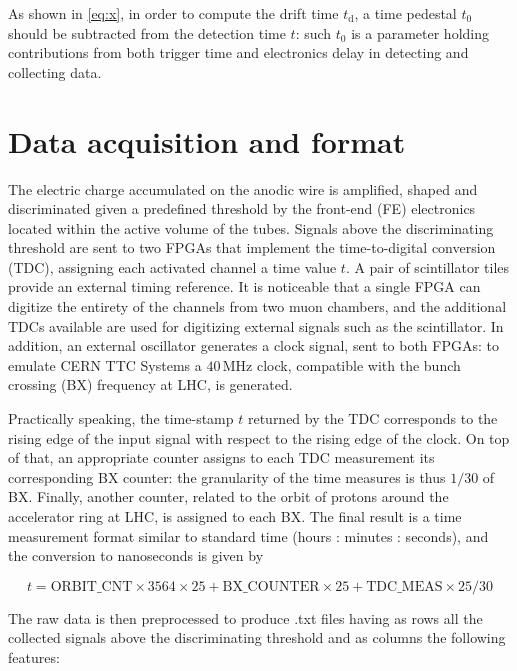 As shown in \autoref{eq:x}, in order to compute the drift time $t_{\text{d}}$, a time pedestal $t_{0}$ should be
subtracted from the detection time $t$: such $t_{0}$ is a parameter holding contributions from both trigger time and
electronics delay in detecting and collecting data.



\section{Data acquisition and format}
\label{s:DataFormat}

The electric charge accumulated on the anodic wire is amplified, shaped and discriminated given a predefined threshold
by the front-end (FE) electronics located within the active volume of the tubes. Signals above the discriminating
threshold are sent to two FPGAs that implement the time-to-digital conversion (TDC), assigning each activated channel a
time value $t$. A pair of scintillator tiles provide an external timing reference. It is noticeable that a single FPGA
can digitize the entirety of the channels from two muon chambers, and the additional TDCs available are used for
digitizing external signals such as the scintillator. In addition, an external oscillator generates a clock signal, sent
to both FPGAs: to emulate CERN TTC Systems a $40\,\si{\mega\hertz}$ clock, compatible with the bunch crossing (BX)
frequency at LHC, is generated.

Practically speaking, the time-stamp $t$ returned by the TDC corresponds to the rising edge of the input signal with
respect to the rising edge of the clock. On top of that, an appropriate counter assigns to each TDC measurement its
corresponding BX counter: the granularity of the time measures is thus $1/30$ of BX. Finally, another counter, related
to the orbit of protons around the accelerator ring at LHC, is assigned to each BX. The final result is a time
measurement format similar to standard time (hours : minutes : seconds), and the conversion to nanoseconds is given by 

\begin{equation}\label{eq:time_conversion}
    t = \text{ORBIT\_CNT} \times 3564 \times 25 + \text{BX\_COUNTER} \times 25 + \text{TDC\_MEAS} \times 25/30
\end{equation}

The raw data is then preprocessed to produce .txt files having as rows all the collected signals above the
discriminating threshold and as columns the following features:

